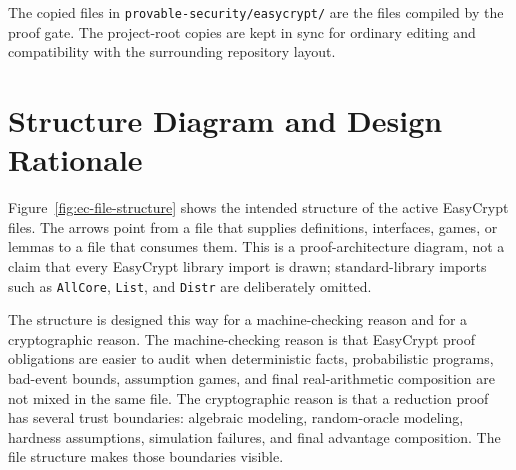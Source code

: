 \documentclass[11pt]{article}
\newcommand{\file}[1]{\nolinkurl{#1}}
\begin{document}
The copied files in \file{provable-security/easycrypt/} are the files compiled
by the proof gate.  The project-root copies are kept in sync for ordinary
editing and compatibility with the surrounding repository layout.

\section{Structure Diagram and Design Rationale}

Figure~\ref{fig:ec-file-structure} shows the intended structure of the active
EasyCrypt files.  The arrows point from a file that supplies definitions,
interfaces, games, or lemmas to a file that consumes them.  This is a
proof-architecture diagram, not a claim that every EasyCrypt library import is
drawn; standard-library imports such as \file{AllCore}, \file{List}, and
\file{Distr} are deliberately omitted.



The structure is designed this way for a machine-checking reason and for a
cryptographic reason.  The machine-checking reason is that EasyCrypt proof
obligations are easier to audit when deterministic facts, probabilistic
programs, bad-event bounds, assumption games, and final real-arithmetic
composition are not mixed in the same file.  The cryptographic reason is that a
reduction proof has several trust boundaries: algebraic modeling, random-oracle
modeling, hardness assumptions, simulation failures, and final advantage
composition.  The file structure makes those boundaries visible.
\end{document}
